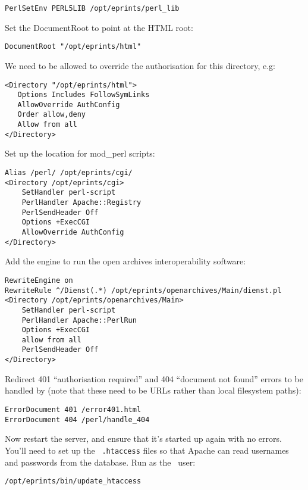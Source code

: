\begin{verbatim}
PerlSetEnv PERL5LIB /opt/eprints/perl_lib
\end{verbatim}

Set the DocumentRoot to point at the HTML root:

\begin{verbatim}
DocumentRoot "/opt/eprints/html"
\end{verbatim}

We need to be allowed to override the authorisation for this directory, e.g:

\begin{verbatim}
<Directory "/opt/eprints/html">
   Options Includes FollowSymLinks
   AllowOverride AuthConfig
   Order allow,deny
   Allow from all
</Directory>
\end{verbatim}

Set up the location for mod\_perl scripts:

\begin{verbatim}
Alias /perl/ /opt/eprints/cgi/
<Directory /opt/eprints/cgi>
    SetHandler perl-script
    PerlHandler Apache::Registry
    PerlSendHeader Off
    Options +ExecCGI
    AllowOverride AuthConfig
</Directory>
\end{verbatim}

Add the engine to run the open archives interoperability software:

\begin{verbatim}
RewriteEngine on
RewriteRule ^/Dienst(.*) /opt/eprints/openarchives/Main/dienst.pl
<Directory /opt/eprints/openarchives/Main>
    SetHandler perl-script
    PerlHandler Apache::PerlRun
    Options +ExecCGI
    allow from all
    PerlSendHeader Off
</Directory>
\end{verbatim}

Redirect 401 ``authorisation required'' and 404 ``document not found'' errors to be handled by \eprints (note that these need to be URLs rather than local filesystem paths):

\begin{verbatim}
ErrorDocument 401 /error401.html
ErrorDocument 404 /perl/handle_404
\end{verbatim}

Now restart the server, and ensure that it's started up again with no errors. You'll need to set up the \eprints\ {\tt .htaccess} files so that Apache can read usernames and passwords from the database. Run as the \eprints\ user:

\begin{verbatim}
/opt/eprints/bin/update_htaccess
\end{verbatim}

